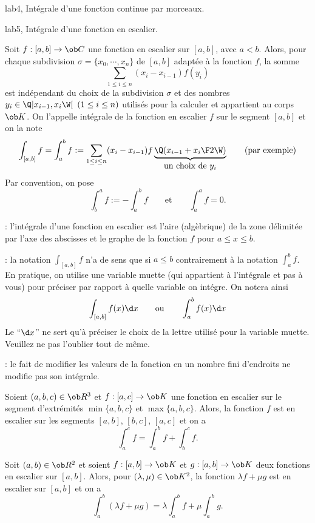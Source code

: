 \Section lab4, Int\'egrale d'une fonction continue par morceaux. 

\Subsection lab5, Int\'egrale d'une fonction en escalier. 

\Definition []  Soit $f:[a,b]\to\ob C$ une fonction en escalier sur $[a,b]$, avec $a<b$. Alors, pour chaque subdivision $\sigma=\{x_0,\cdots,x_n\}$ de $[a,b]$ adapt\'ee \`a la fonction $f$, la somme 
$$
\sum_{1\le i\le n}(x_i-x_{i-1})f(y_i)
$$
est ind\'ependant du choix de la subdivision $\sigma$ et des nombres $y_i\in\Q]x_{i-1},x_i\W[\ \,(1\le i\le n)$ utilis\'es pour la calculer et appartient au corps $\ob K$. On l'appelle int\'egrale de la fonction en escalier $f$ sur le segment $[a,b]$ et on la note 
$$
\int_{[a,b]}f= \int_a^bf:=\sum_{1\le i\le n}(x_i-x_{i-1})f\underbrace{\Q({x_{i-1}+x_i\F 2}\W)}_{\mbox{un choix de $y_i$}}\qquad\mbox{(par exemple)}
$$
Par convention, on pose 
$$
\int_b^af:=-\int_a^bf\qquad \mbox{et}\qquad \int_a^af=0.
$$

\Remarque : l'int\'egrale d'une fonction en escalier est l'aire (alg\`ebrique) de la zone d\'elimit\'ee par l'axe des abscisses et le graphe de la fonction $f$ pour $a\le x\le b$. 
\bigskip

\Remarque : la notation $\int_{[a,b]}f$ n'a de sens que si $a\le b$ contrairement \`a la notation $\int_a^bf$. En pratique, on utilise une variable muette (qui appartient \`a l'int\'egrale et pas \`a vous) 
pour pr\'eciser par rapport \`a quelle variable on int\'egre. On notera ainsi
$$
\int_{[a,b]}f(x)\d x\qquad \mbox{ou}\qquad \int_a^bf(x)\d x
$$
Le ``$\d x$'' ne sert qu'\`a pr\'eciser le choix de la lettre utilis\'e pour la variable muette. Veuillez ne pas l'oublier tout de m\^eme. 
\bigskip

\Remarque  : le fait de modifier les valeurs de la fonction en un nombre fini d'endroits ne modifie pas son int\'egrale. 
\bigskip

\Propriete [Title=Relation de Chasles]
Soient $(a,b,c)\in\ob R^3$ et $f:[a,c]\to\ob K$ une fonction en escalier sur le segment d'extr\'emit\'es $\min\{a,b,c\}$ et $\max\{a,b,c\}$. Alors, la fonction $f$ est en escalier sur les segments $[a,b]$, $[b,c]$, $[a,c]$ et on a 
$$
\int_a^cf=\int_a^bf+\int_b^cf. 
$$

\Propriete [Title=Lin\'earit\'e de l'int\'egrale]
Soit $(a,b)\in\ob R^2$ et soient $f:[a,b]\to\ob K$ et $g:[a,b]\to\ob K$ deux fonctions en escalier sur $[a,b]$. Alors, pour $(\lambda,\mu)\in\ob K^2$, la fonction $\lambda f+\mu g$ est en escalier sur $[a,b]$ et on a 
$$
\int_a^b(\lambda f+\mu g)=\lambda \int_a^bf+\mu \int_a^bg. 
$$

